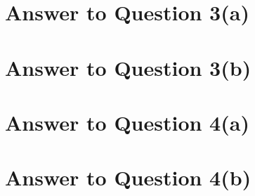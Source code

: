 \documentclass[11pt]{article}
\begin{document}
\section*{Answer to Question 3(a)}

\section*{Answer to Question 3(b)}

\section*{Answer to Question 4(a)}

\section*{Answer to Question 4(b)}
\end{document}

